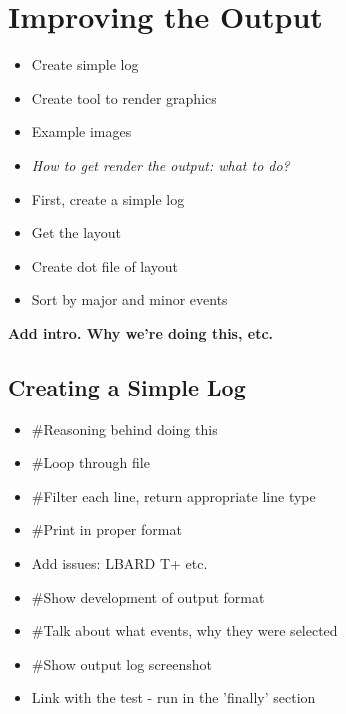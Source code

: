 
\chapter{Improving the Output} %

\label{Chapter5} %

\begin{itemize}
    \item Create simple log
    \item Create tool to render graphics
    \item Example images
\end{itemize}

\begin{itemize}
    \item \emph{How to get render the output: what to do?}
    \item First, create a simple log
    \item Get the layout
    \item Create dot file of layout
    \item Sort by major and minor events
\end{itemize}

\textbf{Add intro. Why we're doing this, etc.}

\section{Creating a Simple Log}
\begin{itemize}
    \item \#Reasoning behind doing this
    \item \#Loop through file
    \item \#Filter each line, return appropriate line type
    \item \#Print in proper format
    \item   Add issues: LBARD T+ etc.
    \item \#Show development of output format
    \item \#Talk about what events, why they were selected
    \item \#Show output log screenshot
    \item Link with the test - run in the 'finally' section
\end{itemize}


